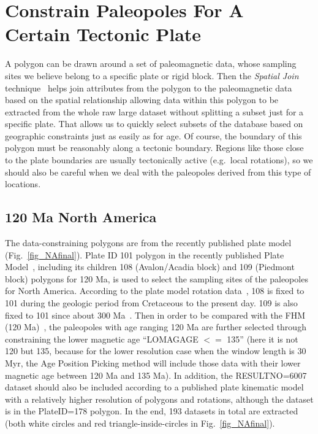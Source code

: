 \appendix
\section{Constrain Paleopoles For A Certain Tectonic Plate}

A polygon can be drawn around a set of paleomagnetic data, whose sampling sites
we believe belong to a specific plate or rigid block. Then the {\em Spatial
Join\/} technique~\cite{J07} helps join attributes from the polygon to the
paleomagnetic data based on the spatial relationship allowing data within this
polygon to be extracted from the whole raw large dataset without splitting a
subset just for a specific plate. That allows us to quickly select subsets of
the database based on geographic constraints just as easily as for age. Of
course, the boundary of this polygon must be reasonably along a tectonic
boundary. Regions like those close to the plate boundaries are usually
tectonically active (e.g.\ local rotations), so we should also be careful when
we deal with the paleopoles derived from this type of locations.

\subsection{120 Ma North America}

The data-constraining polygons are from the recently published plate
model~\cite{Y18} (Fig.~\ref{fig_NAfinal}). Plate ID 101 polygon in the
recently published Plate Model~\cite{Y18}, including its children 108
(Avalon/Acadia block) and 109 (Piedmont block) polygons for 120 Ma,
is used to select the sampling sites of the paleopoles for North America.
According to the plate model rotation data~\cite{Y18}, 108 is fixed to 101
during the geologic period from Cretaceous to the present day. 109 is also fixed
to 101 since about 300 Ma~\cite{C14}. Then in order to be compared with the FHM
(120 Ma)~\cite{M93,M99}, the paleopoles with age ranging
120 Ma are further selected through constraining the lower magnetic
age ``LOMAGAGE $<=$ 135'' (here it is not 120 but 135, because for the lower
resolution case when the window length is 30 Myr, the Age Position Picking
method will include those data with their lower magnetic age between 120 Ma and
135 Ma). In addition, the RESULTNO=6007 dataset should also be included
according to a published plate kinematic model~\cite{Mc06}
with a relatively higher resolution of polygons and
rotations, although the dataset is in the PlateID=178 polygon. In the end, 193
datasets in total are extracted (both white circles and red
triangle-inside-circles in Fig.~\ref{fig_NAfinal}).

